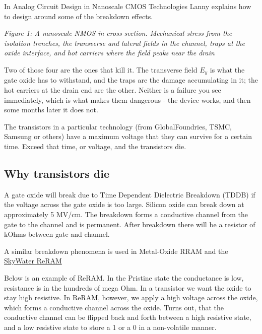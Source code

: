 In Analog Circuit Design in Nanoscale CMOS Technologies
 Lanny explains how to design around some
of the breakdown effects.


{
\centering
{}
}

\emph{Figure 1: A nanoscale NMOS in cross-section. Mechanical stress
from the isolation trenches, the transverse and lateral fields in the
channel, traps at the oxide interface, and hot carriers where the field
peaks near the drain}

Two of those four are the ones that kill it. The transverse field
\(E_y\) is what the gate oxide has to withstand, and the traps are the
damage accumulating in it; the hot carriers at the drain end are the
other. Neither is a failure you see immediately, which is what makes
them dangerous - the device works, and then some months later it does
not.

The transistors in a particular technology (from GlobalFoundries, TSMC,
Samsung or others) have a maximum voltage that they can survive for a
certain time. Exceed that time, or voltage, and the transistors die.

\subsection{Why transistors die}\label{why-transistors-die}

A gate oxide will break due to Time Dependent Dielectric Breakdown
(TDDB) if the voltage across the gate oxide is too large. Silicon oxide
can break down at approximately 5 MV/cm. The breakdown forms a
conductive channel from the gate to the channel and is permanent. After
breakdown there will be a resistor of kOhms between gate and channel.

A similar breakdown phenomena is used in Metal-Oxide RRAM
 and the
\href{https://sky130-fd-pr-reram.readthedocs.io/en/latest/}{SkyWater
ReRAM}

Below is an example of ReRAM. In the Pristine state the conductance is
low, resistance is in the hundreds of mega Ohm. In a transistor we want
the oxide to stay high resistive. In ReRAM, however, we apply a high
voltage across the oxide, which forms a conductive channel across the
oxide. Turns out, that the conductive channel can be flipped back and
forth between a high resistive state, and a low resistive state to store
a 1 or a 0 in a non-volatile manner.


